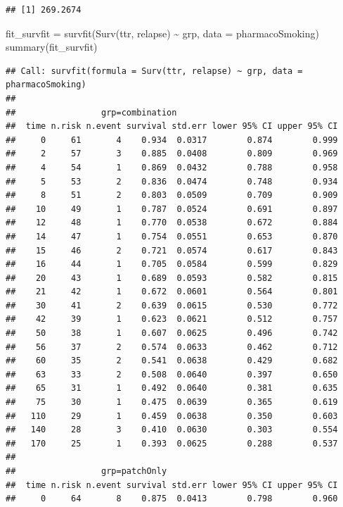 \documentclass[
]{article}
\newenvironment{Shaded}{\begin{snugshade}}{\end{snugshade}}
\newcommand{\AttributeTok}[1]{\textcolor[rgb]{0.77,0.63,0.00}{#1}}
\newcommand{\FunctionTok}[1]{\textcolor[rgb]{0.00,0.00,0.00}{#1}}
\newcommand{\NormalTok}[1]{#1}
\newcommand{\OtherTok}[1]{\textcolor[rgb]{0.56,0.35,0.01}{#1}}
\newcommand{\SpecialCharTok}[1]{\textcolor[rgb]{0.00,0.00,0.00}{#1}}
\begin{document}
\begin{verbatim}
## [1] 269.2674
\end{verbatim}

\begin{Shaded}
\begin{Highlighting}[]
\NormalTok{fit\_survfit  }\OtherTok{=} \FunctionTok{survfit}\NormalTok{(}\FunctionTok{Surv}\NormalTok{(ttr, relapse) }\SpecialCharTok{\textasciitilde{}}\NormalTok{ grp, }\AttributeTok{data =}\NormalTok{ pharmacoSmoking)}
\FunctionTok{summary}\NormalTok{(fit\_survfit)}
\end{Highlighting}
\end{Shaded}

\begin{verbatim}
## Call: survfit(formula = Surv(ttr, relapse) ~ grp, data = pharmacoSmoking)
## 
##                 grp=combination 
##  time n.risk n.event survival std.err lower 95% CI upper 95% CI
##     0     61       4    0.934  0.0317        0.874        0.999
##     2     57       3    0.885  0.0408        0.809        0.969
##     4     54       1    0.869  0.0432        0.788        0.958
##     5     53       2    0.836  0.0474        0.748        0.934
##     8     51       2    0.803  0.0509        0.709        0.909
##    10     49       1    0.787  0.0524        0.691        0.897
##    12     48       1    0.770  0.0538        0.672        0.884
##    14     47       1    0.754  0.0551        0.653        0.870
##    15     46       2    0.721  0.0574        0.617        0.843
##    16     44       1    0.705  0.0584        0.599        0.829
##    20     43       1    0.689  0.0593        0.582        0.815
##    21     42       1    0.672  0.0601        0.564        0.801
##    30     41       2    0.639  0.0615        0.530        0.772
##    42     39       1    0.623  0.0621        0.512        0.757
##    50     38       1    0.607  0.0625        0.496        0.742
##    56     37       2    0.574  0.0633        0.462        0.712
##    60     35       2    0.541  0.0638        0.429        0.682
##    63     33       2    0.508  0.0640        0.397        0.650
##    65     31       1    0.492  0.0640        0.381        0.635
##    75     30       1    0.475  0.0639        0.365        0.619
##   110     29       1    0.459  0.0638        0.350        0.603
##   140     28       3    0.410  0.0630        0.303        0.554
##   170     25       1    0.393  0.0625        0.288        0.537
## 
##                 grp=patchOnly 
##  time n.risk n.event survival std.err lower 95% CI upper 95% CI
##     0     64       8    0.875  0.0413        0.798        0.960

\end{verbatim}
\end{document}
